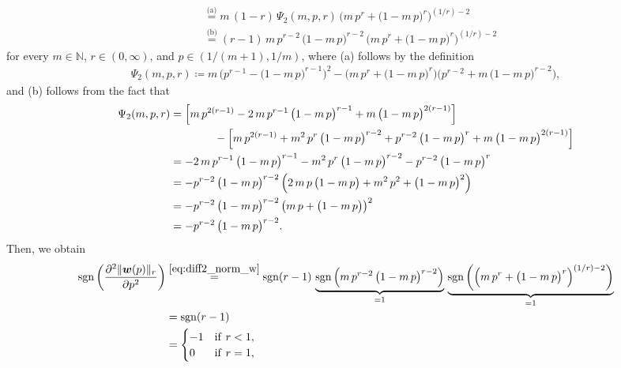 \documentclass[conference, draftcls, onecolumn]{IEEEtran}
\theoremstyle{plain}
\newcommand{\bvec}[1]{\boldsymbol{#1}}
\newcommand{\sgn}{\operatorname{sgn}}
\newcommand{\lemref}[1]{Lemma~\ref{#1}}
\begin{document}
\begin{IEEEproof}[Proof of \lemref{lem:convex_w}]
\begin{align}
\\
& \overset{\text{(a)}}{=}
m \, (1-r) \, \Psi_{2}(m, p, r) \, \Big( m \, p^{r} + \big( 1 - m \, p \big)^{r} \Big)^{(1/r) - 2}
\\
& \overset{\text{(b)}}{=}
(r-1) \, m \, p^{r-2} \, \big( 1 - m \, p \big)^{r-2} \, \Big( m \, p^{r} + \big( 1 - m \, p \big)^{r} \Big)^{(1/r) - 2}
\label{eq:diff2_norm_w}
\end{align}
for every $m \in \mathbb{N}$, $r \in (0, \infty)$, and $p \in (1/(m+1), 1/m)$, where (a) follows by the definition
\begin{align}
\Psi_{2}(m, p, r)
\coloneqq
m \, \Big( p^{r-1} - \big( 1 - m \, p \big)^{r-1} \Big)^{2} - \Big( m \, p^{r} + \big( 1 - m \, p \big)^{r} \Big) \Big( p^{r-2} + m \, \big( 1 - m \, p \big)^{r-2} \Big) ,
\end{align}
and (b) follows from the fact that
\begin{align}
\Psi_{2}(m, p, r)
& =
\Big[ m \, p^{2(r-1)} - 2 \, m \, p^{r-1} \, \big( 1 - m \, p \big)^{r-1} + m \, \big( 1 - m \, p \big)^{2(r-1)} \Big]
\notag \\
& \qquad \qquad
- \Big[ m \, p^{2(r-1)} + m^{2} \, p^{r} \, \big( 1 - m \, p \big)^{r-2} + p^{r-2} \, \big( 1 - m \, p \big)^{r} + m \, \big( 1 - m \, p \big)^{2(r-1)} \Big]
\\
& =
- 2 \, m \, p^{r-1} \, \big( 1 - m \, p \big)^{r-1} - m^{2} \, p^{r} \, \big( 1 - m \, p \big)^{r-2} - p^{r-2} \, \big( 1 - m \, p \big)^{r}
\\
& =
- p^{r-2} \, \big( 1 - m \, p \big)^{r-2} \, \Big( 2 \, m \, p \, \big( 1 - m \, p \big) + m^{2} \, p^{2} + \big( 1 - m \, p \big)^{2} \Big)
\\
& =
- p^{r-2} \, \big( 1 - m \, p \big)^{r-2} \, \big( m \, p + \big( 1 - m \, p \big) \big)^{2}
\\
& =
- p^{r-2} \, \big( 1 - m \, p \big)^{r-2} .
\end{align}
Then, we obtain
\begin{align}
\sgn\bigg( \frac{ \partial^{2} \| \bvec{w}( p ) \|_{r} }{ \partial p^{2} } \bigg)
& \overset{\eqref{eq:diff2_norm_w}}{=}
\sgn(r-1) \, \underbrace{ \sgn\Big( m \, p^{r-2} \, \big( 1 - m \, p \big)^{r-2} \Big) }_{=1} \, \underbrace{ \sgn\bigg( \Big( m \, p^{r} + \big( 1 - m \, p \big)^{r} \Big)^{(1/r) - 2} \bigg) }_{=1}
\\
& =
\sgn(r-1)
\\
& =
\begin{cases}
-1
& \mathrm{if} \ r < 1 ,
\\
0
& \mathrm{if} \ r = 1 ,

\end{cases}
\end{align}
\end{IEEEproof}
\end{document}
